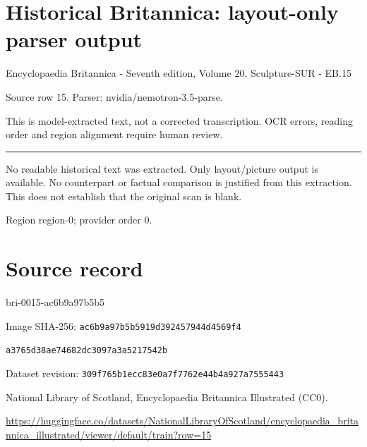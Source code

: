 \documentclass[11pt]{article}
\begin{document}
\section*{Historical Britannica: layout-only parser output}
Encyclopaedia Britannica - Seventh edition, Volume 20, Sculpture-SUR - EB.15\par
{\small Source row 15. Parser: nvidia/nemotron-3.5-parse.\par}
{\small This is model-extracted text, not a corrected transcription. OCR errors, reading order and region alignment require human review.\par}
\hrule\medskip
{\color{red} No readable historical text was extracted. Only layout/picture output is available. No counterpart or factual comparison is justified from this extraction. This does not establish that the original scan is blank.\par}


\par

{\scriptsize\color{gray} Region region-0; provider order 0.\par}
\medskip
\newpage\section*{Source record}
bri-0015-ac6b9a97b5b5\par
Image SHA-256: \texttt{ac6b9a97b5b5919d392457944d4569f4}\par\texttt{a3765d38ae74682dc3097a3a5217542b}\par
Dataset revision: \texttt{309f765b1ecc83e0a7f7}\texttt{762e44b4a927a7555443}\par
National Library of Scotland, Encyclopaedia Britannica Illustrated (CC0).\par
\url{https://huggingface.co/datasets/NationalLibraryOfScotland/encyclopaedia_britannica_illustrated/viewer/default/train?row=15}
\end{document}
